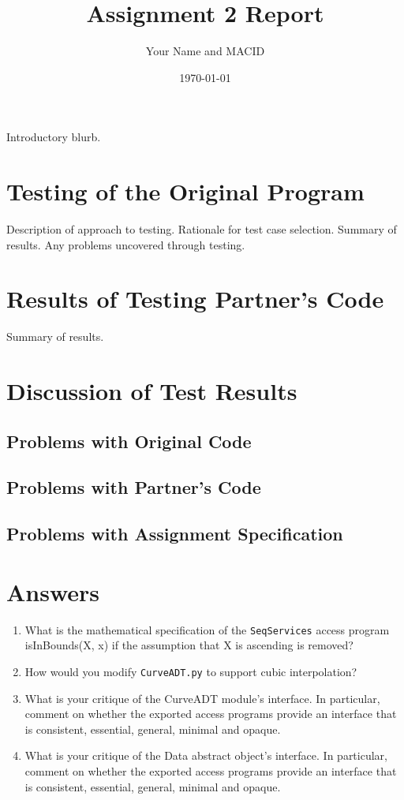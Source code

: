 \documentclass[12pt]{article}
\title{Assignment 2 Report}
\author{Your Name and MACID}
\date{\today}
\begin{document}
\maketitle

Introductory blurb.

\section{Testing of the Original Program}

Description of approach to testing.  Rationale for test case selection.  Summary
of results.  Any problems uncovered through testing.

\section{Results of Testing Partner's Code}

Summary of results.

\section{Discussion of Test Results}

\subsection{Problems with Original Code}

\subsection{Problems with Partner's Code}

\subsection{Problems with Assignment Specification}

\section{Answers}

\begin{enumerate}

\item What is the mathematical specification of the \texttt{SeqServices} access
  program isInBounds(X, x) if the assumption that X is ascending is removed?

\item How would you modify \texttt{CurveADT.py} to support cubic interpolation?

\item What is your critique of the CurveADT module's interface.  In particular,
  comment on whether the exported access programs provide an interface that is
  consistent, essential, general, minimal and opaque.

\item What is your critique of the Data abstract object's interface.  In
  particular, comment on whether the exported access programs provide an
  interface that is consistent, essential, general, minimal and opaque.

\end{enumerate}
\end{document}
